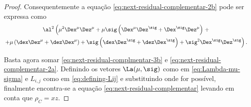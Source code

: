 \begin{proof}
Consequentemente a equação \eqref{eq:next-residual-complementar-2b} pode ser
expressa como
\begin{multline}
\label{eq:next-residual-complmentar-3b}
\al^2\left(\mu^2\Dex^\mu\Dez^\mu + \mu\sig \left(\Dex^\mu\Dez^\sig +
			\Dex^\sig\Dez^\mu \right) \right. +  \\ \left. + \mu\left(\dex\Dez^\mu +
			\dez\Dex^\mu \right) +   \sig\left(\dex\Dez^\sig + \dez\Dex^\sig\right) +
			\sig^2\Dex^\sig\Dez^\sig \right).
\end{multline}


Basta agora somar  \eqref{eq:next-residual-complmentar-3b}  e
 \eqref{eq:next-residual-complementar-2a}. Definindo os vetores
$\La(\mu,\sig)$ como em \eqref{eq:Lambda-mu-sigma} e $L_{i,j}$ como em
\eqref{eq:defining-Lij} e substituindo onde for possível, finalmente encontra-se
a equação \eqref{eq:next-residual-complementar} levando em conta que $\rho_C = xz$.
\end{proof} 

